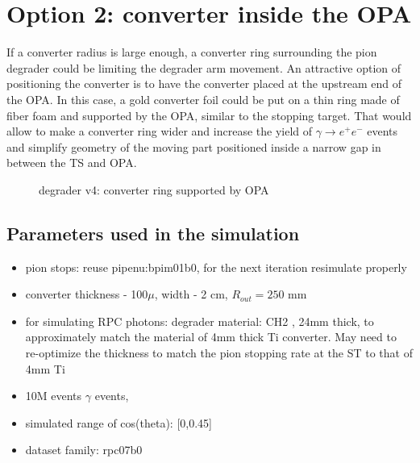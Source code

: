 %
\section{Option 2: converter inside the OPA}

If a converter radius is large enough, a converter ring surrounding the pion degrader
could be limiting the degrader arm movement. 
An attractive option of positioning the converter is to have the converter placed 
at the upstream end of the OPA. In this case, a gold converter foil could be put
on a thin ring made of fiber foam and supported by the OPA, similar to the stopping target.
That would allow to make a converter ring wider and increase the yield of $\gamma \to e^+e^-$
events and simplify geometry of the moving part positioned inside a narrow gap in between
the TS and OPA.

\begin{figure}[H]
  \caption{
    \label{figure:degrader_v4}
    degrader v4: converter ring supported by OPA
  }
\end{figure}

\subsection{Parameters used in the simulation}

\begin{itemize}
\item
  pion stops: reuse pipenu:bpim01b0, for the next iteration resimulate properly
\item
  converter thickness - 100$\mu$, width - 2 cm, $R_{out} = 250$ mm
\item 
  for simulating RPC photons: degrader material: CH2 , 24mm thick,
  to approximately match the material of 4mm thick Ti converter.
  May need to re-optimize the thickness to match the pion stopping rate
  at the ST to that of 4mm Ti
\item
  10M events $\gamma$ events, 
\item
  simulated range of cos(theta): [0,0.45] 
\item
  dataset family: rpc07b0
\end{itemize}


